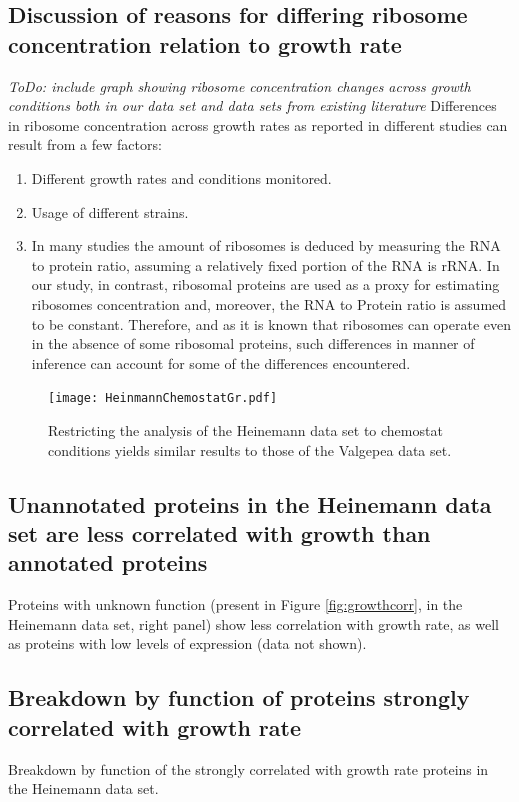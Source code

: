 \documentclass[notitlepage]{article}
\begin{document}
\subsection{Discussion of reasons for differing ribosome concentration relation to growth rate}
\label{ribosomeconc}
\emph{ToDo: include graph showing ribosome concentration changes across growth conditions both in our data set and data sets from existing literature}
Differences in ribosome concentration  across growth rates as reported in different studies can result from a few factors:
\begin{enumerate}
\item Different growth rates and conditions monitored.
\item Usage of different strains.
\item In many studies the amount of ribosomes is deduced by measuring the RNA to protein ratio, assuming a relatively fixed portion of the RNA is rRNA.
In our study, in contrast, ribosomal proteins are used as a proxy for estimating ribosomes concentration and, moreover, the RNA to Protein ratio is assumed to be constant.
Therefore, and as it is known that ribosomes can operate even in the absence of some ribosomal proteins, such differences in manner of inference can account for some of the differences encountered.
\end{enumerate}

\begin{figure}[h]
\centering
\texttt{[image: HeinmannChemostatGr.pdf]}
\caption{
  Restricting the analysis of the Heinemann data set to chemostat conditions yields similar results to those of the Valgepea data set.
}
\label{fig:growthcorrchemo}
\end{figure}
\subsection{Unannotated proteins in the Heinemann data set are less correlated with growth than annotated proteins}
Proteins with unknown function (present in Figure \ref{fig:growthcorr}, in the Heinemann data set, right panel) show less correlation with growth rate, as well as proteins with low levels of expression (data not shown).

\subsection{Breakdown by function of proteins strongly correlated with growth rate}
\begin{table}[h]
\centering
\caption{Breakdown by function of the strongly correlated with growth rate proteins in the Heinemann data set.}
\end{table}
\end{document}
